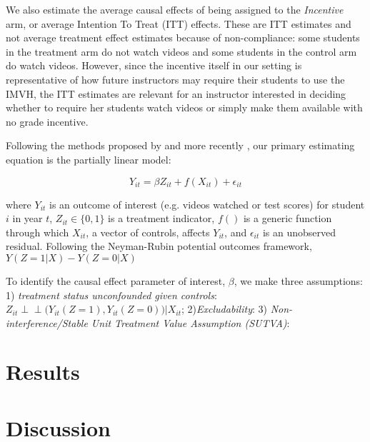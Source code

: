 \documentclass[12pt]{article}
\begin{document}
We also estimate the average causal effects of being assigned to the \textit{Incentive} arm, or average Intention To Treat (ITT) effects. These are ITT estimates and not average treatment effect estimates because of non-compliance: some students in the treatment arm do not watch videos and some students in the control arm do watch videos. However, since the incentive itself in our setting is representative of how future instructors may require their students to use the IMVH, the ITT estimates are relevant for an instructor interested in deciding whether to require her students watch videos or simply make them available with no grade incentive.

Following the methods proposed by \textcite{robinson1988} and more recently \textcite{wa2018}, our primary estimating equation is the partially linear model:

\begin{equation}
	Y_{it} = \beta Z_{it} + f(X_{it}) + \epsilon_{it}
\end{equation}

where $Y_{it}$ is an outcome of interest (e.g. videos watched or test scores) for student $i$ in year $t$, $Z_{it} \in \{0,1\}$ is a treatment indicator, $f()$ is a generic function through which $X_{it}$, a vector of controls, affects $Y_{it}$, and $\epsilon_{it}$ is an unobserved residual. Following the Neyman-Rubin potential outcomes framework, $Y(Z=1|X) - Y(Z=0|X)$

To identify the causal effect parameter of interest, $\beta$, we make three assumptions: 1) \textit{treatment status unconfounded given controls}: $Z_{it} \perp \!\!\! \perp \Big(Y_{it}(Z=1), Y_{it}(Z=0)\Big) \Big| X_{it}$; 2)\textit{Excludability}: 3) \textit{Non-interference/Stable Unit Treatment Value Assumption (SUTVA)}: 




\section{Results} \label{results}


\section{Discussion} \label{discussion}
\end{document}
